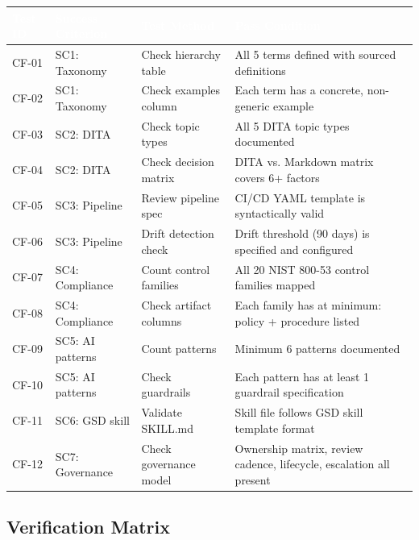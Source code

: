 \documentclass[11pt,letterpaper]{article}
\newcommand{\tableheader}[1]{\textbf{\sffamily\textcolor{white}{#1}}}
\begin{document}
\begin{center}
\begin{tabularx}{\textwidth}{L{1.5cm}L{3cm}L{3cm}X}
\toprule
{}
\tableheader{Test ID} & \tableheader{Success Criterion} & \tableheader{Test Method} & \tableheader{Pass Condition} \\
\midrule
CF-01 & SC1: Taxonomy & Check hierarchy table & All 5 terms defined with sourced definitions \\
CF-02 & SC1: Taxonomy & Check examples column & Each term has a concrete, non-generic example \\
CF-03 & SC2: DITA & Check topic types & All 5 DITA topic types documented \\
CF-04 & SC2: DITA & Check decision matrix & DITA vs. Markdown matrix covers 6+ factors \\
CF-05 & SC3: Pipeline & Review pipeline spec & CI/CD YAML template is syntactically valid \\
CF-06 & SC3: Pipeline & Drift detection check & Drift threshold (90 days) is specified and configured \\
CF-07 & SC4: Compliance & Count control families & All 20 NIST 800-53 control families mapped \\
CF-08 & SC4: Compliance & Check artifact columns & Each family has at minimum: policy + procedure listed \\
CF-09 & SC5: AI patterns & Count patterns & Minimum 6 patterns documented \\
CF-10 & SC5: AI patterns & Check guardrails & Each pattern has at least 1 guardrail specification \\
CF-11 & SC6: GSD skill & Validate SKILL.md & Skill file follows GSD skill template format \\
CF-12 & SC7: Governance & Check governance model & Ownership matrix, review cadence, lifecycle, escalation all present \\
\bottomrule
\end{tabularx}
\end{center}

\subsection{Verification Matrix}
\end{document}
